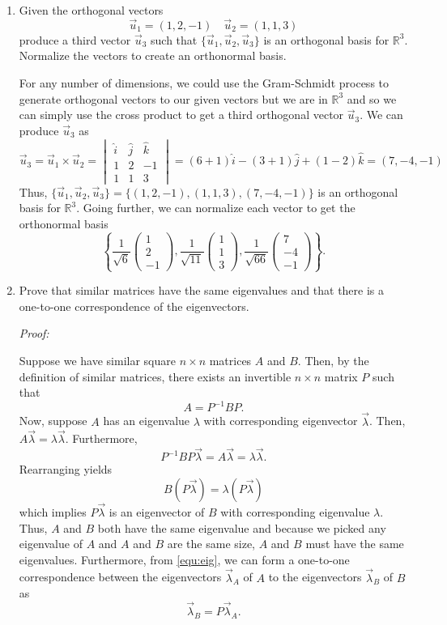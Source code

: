 \documentclass[a4paper,12pt]{article}
\newcommand{\reals}{\mathbb{R}}
\newcommand{\pmat}[1]{\begin{pmatrix} #1 \end{pmatrix}}
\newenvironment{proof}[2][$\square$]
    {\setlength{\parskip}{0pt}\par\textit{Proof:} #2\setlength{\parskip}{0.25cm}
        \savebox{\qed}{#1}
        \begin{adjustwidth}{\widthof{Proof:}}{}
    }
    {
        \hfill\usebox{\qed}\end{adjustwidth}
    }
\begin{document}
\begin{enumerate}[label = \arabic*.]
	\item Given the orthogonal vectors
	\[
		\vec{u}_1 = (1,2,-1) \quad \vec{u}_2 = (1, 1, 3)
	\]
	produce a third vector $ \vec{u}_3 $ such that $ \{\vec{u}_1, \vec{u}_2, \vec{u}_3\} $ is an orthogonal basis for $ \reals^3 $. Normalize the vectors to create an orthonormal basis.
	
	For any number of dimensions, we could use the Gram-Schmidt process to generate orthogonal vectors to our given vectors but we are in $ \reals^3 $ and so we can simply use the cross product to get a third orthogonal vector $ \vec{u}_3 $. We can produce $ \vec{u}_3 $ as
	\[
		\vec{u}_3 = \vec{u}_1 \times \vec{u}_2
		=
		\begin{vmatrix}
			\hat{i} & \hat{j} & \hat{k} \\
			1 & 2 & -1 \\
			1 & 1 & 3
		\end{vmatrix}
		=
		(6 + 1)\hat{i} - (3 + 1)\hat{j} + (1 - 2)\hat{k} = (7, -4, -1)
	\]
	Thus, $ \{\vec{u}_1, \vec{u}_2, \vec{u}_3\} = \{(1,2,-1), (1,1,3), (7,-4,-1)\} $ is an orthogonal basis for $ \reals^3 $. Going further, we can normalize each vector to get the orthonormal basis
	\[
		\left\{
		\frac{1}{\sqrt{6}} \pmat{1 \\ 2 \\ -1},
		\frac{1}{\sqrt{11}} \pmat{1 \\ 1 \\ 3},
		\frac{1}{\sqrt{66}} \pmat{7 \\ -4 \\ -1} 
		\right\}.
	\]
	
	\item Prove that similar matrices have the same eigenvalues and that there is a one-to-one correspondence of the eigenvectors.
	
	\begin{proof}{}
		Suppose we have similar square $ n \times n $ matrices $ A $ and $ B $. Then, by the definition of similar matrices, there exists an invertible $ n \times n $ matrix $ P $ such that
		\begin{equation}
			A = P^{-1} B P. \label{equ:sim}
		\end{equation}
		Now, suppose $ A $ has an eigenvalue $ \lambda $ with corresponding eigenvector $ \vec{\lambda} $. Then, $ A \vec{\lambda} = \lambda \vec{\lambda} $. Furthermore,
		\[
			P^{-1} B P \vec{\lambda} = A \vec{\lambda} = \lambda \vec{\lambda}.
		\]
		Rearranging yields
		\begin{equation}
			B (P \vec{\lambda}) = \lambda (P \vec{\lambda}) \label{equ:eig}
		\end{equation}
		which implies $ P \vec{\lambda} $ is an eigenvector of $ B $ with corresponding eigenvalue $ \lambda $. Thus, $ A $ and $ B $ both have the same eigenvalue and because we picked any eigenvalue of $ A $ and $ A $ and $ B $ are the same size, $ A $ and $ B $ must have the same eigenvalues. Furthermore, from \eqref{equ:eig}, we can form a one-to-one correspondence between the eigenvectors $ \vec{\lambda}_A $ of $ A $ to the eigenvectors $ \vec{\lambda}_B $ of $ B $ as
		\[
			\vec{\lambda}_B = P \vec{\lambda}_A.
		\]
	\end{proof}
\end{enumerate}
\end{document}

